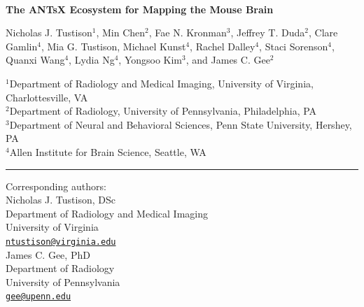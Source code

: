 \documentclass[
  12pt,
]{article}
\author{}
\date{\vspace{-2.5em}}
\begin{document}
\linenumbers
{}


\begin{centering}

$ $

\vspace{6cm}

\LARGE

{\bf The ANTsX Ecosystem for Mapping the Mouse Brain}

\vspace{1.0 cm}

\normalsize

Nicholas J. Tustison$^{1}$,
Min Chen$^{2}$,
Fae N. Kronman$^{3}$,
Jeffrey T. Duda$^{2}$,
Clare Gamlin$^{4}$,
Mia G. Tustison,
Michael Kunst$^{4}$,
Rachel Dalley$^{4}$,
Staci Sorenson$^{4}$,
Quanxi Wang$^{4}$,
Lydia Ng$^{4}$,
Yongsoo Kim$^{3}$, and
James C. Gee$^{2}$

\small

$^{1}$Department of Radiology and Medical Imaging, University of Virginia, Charlottesville, VA \\
$^{2}$Department of Radiology, University of Pennsylvania, Philadelphia, PA \\
$^{3}$Department of Neural and Behavioral Sciences, Penn State University, Hershey, PA \\
$^{4}$Allen Institute for Brain Science, Seattle, WA \\

\vspace{1.2 cm}

\end{centering}

\vspace{3.5 cm}

\noindent

\rule{4cm}{0.4pt}

\scriptsize

Corresponding authors:\\

Nicholas J. Tustison, DSc\\
Department of Radiology and Medical Imaging\\
University of Virginia\\
\href{mailto:ntustison@virginia.edu}{\nolinkurl{ntustison@virginia.edu}}\\

James C. Gee, PhD\\
Department of Radiology\\
University of Pennsylvania\\
\href{mailto:gee@upenn.edu}{\nolinkurl{gee@upenn.edu}}
\end{document}
